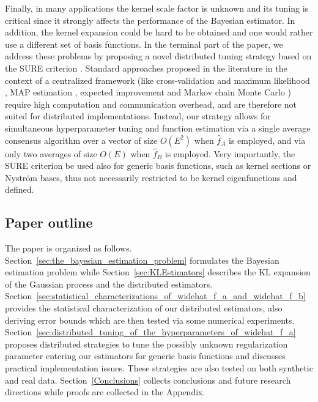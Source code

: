 \documentclass[10pt,twocolumn,twoside]{IEEEtran}					%
\theoremstyle	{plain}
\newcommand	{\Section}				[0]	{Section}
\begin{document}
Finally, in many applications the kernel scale factor is unknown and its tuning is critical since it strongly affects the performance of the Bayesian estimator. In addition, the kernel expansion could be hard to be obtained and one would rather use a different set of basis functions. In the terminal part of the paper, we address these problems by proposing a novel distributed tuning strategy based on the \ac{SURE} criterion \cite{stein__1981__estimation_of_the_mean_of_a_multivariate_normal_distribution}. Standard approaches proposed in the literature in the context of a centralized framework (like cross-validation and maximum likelihood \cite{Rice1986,Golub79,Maritz:1989,Hastie09}, MAP estimation \cite{Xu:11}, expected improvement \cite{Snoek:12} and Markov chain Monte Carlo \cite{Gilks,Magni1998}) require high computation and communication overhead, and are therefore not suited for distributed implementations. Instead, our strategy allows for simultaneous hyperparameter tuning and function estimation via a single average consensus algorithm over a vector of size $O(E^2)$ when $\widehat{f}_{A}$ is employed, and via only two averages of size $O(E)$ when $\widehat{f}_{B}$ is employed. Very importantly, the \ac{SURE} criterion be used also for generic basis functions, such as kernel sections or Nystr{\"o}m bases, thus not necessarily restricted to be kernel eigenfunctions and defined.

\vspace{-2mm}
\subsection{Paper outline}
 
The paper is organized as follows. \Section~\ref{sec:the_bayesian_estimation_problem} formulates the Bayesian estimation problem while \Section~\ref{sec:KLEstimators} describes the \ac{KL} expansion of the Gaussian process and the distributed estimators. \Section~\ref{sec:statistical_characterizations_of_widehat_f_a_and_widehat_f_b} provides the statistical characterization of our distributed estimators, also deriving error bounds which are then tested via some numerical experiments. 
\Section~\ref{sec:distributed_tuning_of_the_hyperparameters_of_widehat_f_a} proposes distributed strategies to tune the possibly unknown regularization parameter entering our estimators for generic basis functions and discusses practical implementation issues. These strategies are also tested on both synthetic and real data. \Section~\ref{Conclusions} collects conclusions and future research directions while proofs are collected in the Appendix.
 
\end{document}
